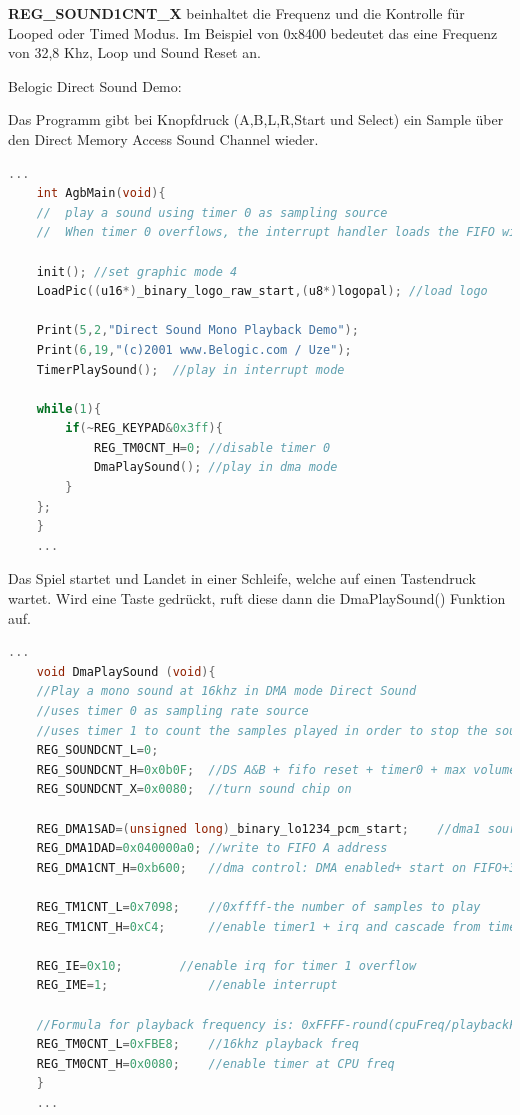\documentclass[11pt,a4paper]{scrartcl}
\begin{document}
\textbf{REG\_SOUND1CNT\_X} beinhaltet die Frequenz und die Kontrolle f\"ur Looped oder Timed Modus. Im Beispiel von 0x8400 bedeutet das eine Frequenz von 32,8 Khz, Loop und Sound Reset an. 

\newpage

Belogic Direct Sound Demo:

Das Programm gibt bei Knopfdruck (A,B,L,R,Start und Select) ein Sample \"uber den Direct Memory Access Sound Channel wieder.

\vspace{5mm}
\begin{lstlisting}[language=C++, caption={Belogic Direct Sound Demo}, label={list:directsound1}]
    ...
	int AgbMain(void){
	//	play a sound using timer 0 as sampling source
	//	When timer 0 overflows, the interrupt handler loads the FIFO with the next sample
	
	init(); //set graphic mode 4
	LoadPic((u16*)_binary_logo_raw_start,(u8*)logopal); //load logo

	Print(5,2,"Direct Sound Mono Playback Demo");
	Print(6,19,"(c)2001 www.Belogic.com / Uze");
	TimerPlaySound();  //play in interrupt mode

	while(1){
		if(~REG_KEYPAD&0x3ff){
			REG_TM0CNT_H=0;	//disable timer 0
			DmaPlaySound(); //play in dma mode
		}
	};
	}
	...
\end{lstlisting}

Das Spiel startet und Landet in einer Schleife, welche auf einen Tastendruck wartet. Wird eine Taste gedr\"uckt, ruft diese dann die DmaPlaySound() Funktion auf.

\vspace{5mm}
\begin{lstlisting}[language=C++, caption={Belogic DmaPlaySound()}, label={list:directsound2}]
    ...
	void DmaPlaySound (void){
	//Play a mono sound at 16khz in DMA mode Direct Sound
	//uses timer 0 as sampling rate source
	//uses timer 1 to count the samples played in order to stop the sound 
	REG_SOUNDCNT_L=0;
	REG_SOUNDCNT_H=0x0b0F;  //DS A&B + fifo reset + timer0 + max volume to L and R
	REG_SOUNDCNT_X=0x0080;  //turn sound chip on
	
	REG_DMA1SAD=(unsigned long)_binary_lo1234_pcm_start;	//dma1 source
	REG_DMA1DAD=0x040000a0; //write to FIFO A address
	REG_DMA1CNT_H=0xb600;	//dma control: DMA enabled+ start on FIFO+32bit+repeat
	
	REG_TM1CNT_L=0x7098;	//0xffff-the number of samples to play
	REG_TM1CNT_H=0xC4;		//enable timer1 + irq and cascade from timer 0

	REG_IE=0x10;	  	//enable irq for timer 1 overflow
	REG_IME=1;				//enable interrupt
	
	//Formula for playback frequency is: 0xFFFF-round(cpuFreq/playbackFreq)
	REG_TM0CNT_L=0xFBE8;	//16khz playback freq
	REG_TM0CNT_H=0x0080; 	//enable timer at CPU freq 
	}
	...
\end{lstlisting}
\newpage
\end{document}
